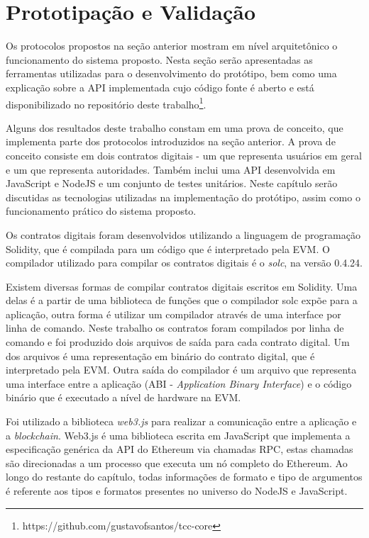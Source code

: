 \documentclass[tcc,capa]{texufpel}
\begin{document}
        
\chapter{Prototipação e Validação}\label{chap:desenvolvimento}
    
    Os protocolos propostos na seção anterior mostram em nível arquitetônico o funcionamento do sistema proposto. Nesta seção serão apresentadas as ferramentas utilizadas para o desenvolvimento do protótipo, bem como uma explicação sobre a API implementada cujo código fonte é aberto e está disponibilizado no repositório deste trabalho\footnote{https://github.com/gustavofsantos/tcc-core}.
    
    Alguns dos resultados deste trabalho constam em uma prova de conceito, que implementa parte dos protocolos introduzidos na seção anterior. A prova de conceito consiste em dois contratos digitais - um que representa usuários em geral e um que representa autoridades. Também inclui uma API desenvolvida em JavaScript e NodeJS e um conjunto de testes unitários. Neste capítulo serão discutidas as tecnologias utilizadas na implementação do protótipo, assim como o funcionamento prático do sistema proposto.
    
    Os contratos digitais foram desenvolvidos utilizando a linguagem de programação Solidity, que é compilada para um código que é interpretado pela EVM. O compilador utilizado para compilar os contratos digitais é o \textit{solc}, na versão 0.4.24. 
    
    Existem diversas formas de compilar contratos digitais escritos em Solidity. Uma delas é a partir de uma biblioteca de funções que o compilador solc expõe para a aplicação, outra forma é utilizar um compilador através de uma interface por linha de comando. Neste trabalho os contratos foram compilados por linha de comando e foi produzido dois arquivos de saída para cada contrato digital. Um dos arquivos é uma representação em binário do contrato digital, que é interpretado pela EVM. Outra saída do compilador é um arquivo que representa uma interface entre a aplicação (ABI - \textit{Application Binary Interface}) e o código binário que é executado a nível de hardware na EVM.
    
    Foi utilizado a biblioteca \textit{web3.js} para realizar a comunicação entre a aplicação e a \textit{blockchain}. Web3.js é uma biblioteca escrita em JavaScript que implementa a especificação genérica da API do Ethereum via chamadas RPC, estas chamadas são direcionadas a um processo que executa um nó completo do Ethereum. Ao longo do restante do capítulo, todas informações de formato e tipo de argumentos é referente aos tipos e formatos presentes no universo do NodeJS e JavaScript.
    
\end{document}
